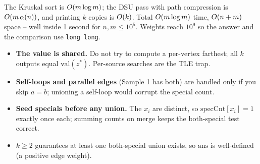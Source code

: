 \begin{complexitybox}
The Kruskal sort is \(O(m\log m)\); the DSU pass with path compression is
\(O(m\,\alpha(n))\), and printing \(k\) copies is \(O(k)\).  Total
\(O(m\log m)\) time, \(O(n+m)\) space -- well inside 1 second for
\(n,m\le 10^5\).  Weights reach \(10^9\) so the answer and the comparison use
\texttt{long long}.
\end{complexitybox}

\begin{hardeningbox}
\begin{itemize}[nosep,leftmargin=1.4em]
\item \textbf{The value is shared.}  Do not try to compute a per-vertex farthest;
      all \(k\) outputs equal \(\mathrm{val}(z^{*})\).  Per-source searches are the TLE trap.
\item \textbf{Self-loops and parallel edges} (Sample 1 has both) are handled only if
      you skip \(a=b\); unioning a self-loop would corrupt the special count.
\item \textbf{Seed specials before any union.}  The \(x_i\) are distinct, so
      \(\mathrm{specCnt}[x_i]=1\) exactly once each; summing counts on merge keeps the
      both-special test correct.
\item \(k\ge 2\) guarantees at least one both-special union exists, so
      \(\mathrm{ans}\) is well-defined (a positive edge weight).
\end{itemize}
\end{hardeningbox}

\begin{recallbox}
\end{recallbox}
